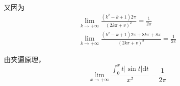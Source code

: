 又因为
\begin{gather*}
	\lim _{k\rightarrow +\infty }\frac{\left( k^{2} -k+1\right) 2\pi }{( 2k\pi +v)^{2}} =\frac{1}{2\pi }\\
	\lim _{k\rightarrow +\infty }\frac{\left( k^{2} -k+1\right) 2\pi +8k\pi +8\pi }{( 2k\pi +v)^{2}} =\frac{1}{2\pi }
\end{gather*}


由夹逼原理，
\begin{equation*}
	\lim _{x\rightarrow +\infty }\frac{\int _{0}^{x} t|\sin t|\mathrm{d} t}{x^{2}} =\frac{1}{2\pi }
\end{equation*}



\ifx\allfiles\undefined

\fi